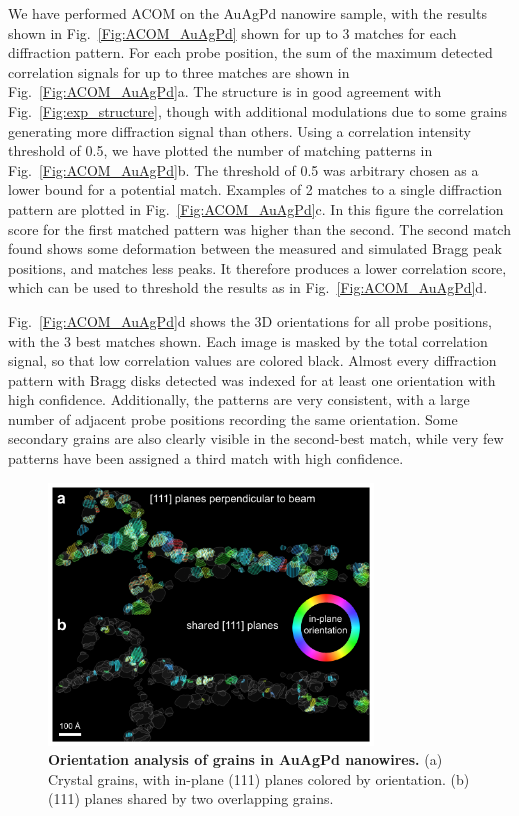 \documentclass[%
 superscriptaddress,
 aip,
 amsmath,amssymb,
reprint,%
 author-year,%
longbibliography
]{revtex4-2}
\begin{document}
We have performed ACOM on the AuAgPd nanowire sample, with the results shown in Fig.~\ref{Fig:ACOM_AuAgPd} shown for up to 3 matches for each diffraction pattern. For each probe position, the sum of the maximum detected correlation signals for up to three matches are shown in Fig.~\ref{Fig:ACOM_AuAgPd}a. The structure is in good agreement with Fig.~\ref{Fig:exp_structure}, though with additional modulations due to some grains generating more diffraction signal than others. Using a correlation intensity threshold of 0.5, we have plotted the number of matching patterns in Fig.~\ref{Fig:ACOM_AuAgPd}b. The threshold of 0.5 was arbitrary chosen as a lower bound for a potential match. Examples of 2 matches to a single diffraction pattern are plotted in Fig.~\ref{Fig:ACOM_AuAgPd}c. In this figure the correlation score for the first matched pattern was higher than the second. The second match found shows some deformation between the measured and simulated Bragg peak positions, and matches less peaks. It therefore produces a lower correlation score, which can be used to threshold the results as in Fig.~\ref{Fig:ACOM_AuAgPd}d.


Fig.~\ref{Fig:ACOM_AuAgPd}d shows the 3D orientations for all probe positions, with the 3 best matches shown. Each image is masked by the total correlation signal, so that low correlation values are colored black. Almost every diffraction pattern with Bragg disks detected was indexed for at least one orientation with high confidence. Additionally, the patterns are very consistent, with a large number of adjacent probe positions recording the same orientation. Some secondary grains are also clearly visible in the second-best match, while very few patterns have been assigned a third match with high confidence. 

\begin{figure}[htbp]
    \centering
    \includegraphics[width=3.4in]{figure_AuAg_twins_v08.pdf}
    \caption{{\bf Orientation analysis of grains in AuAgPd nanowires.} (a) Crystal grains, with in-plane (111) planes colored by orientation. (b) (111) planes shared by two overlapping grains.}
    \label{Fig:ACOM_111_twins}
\end{figure}
\end{document}
